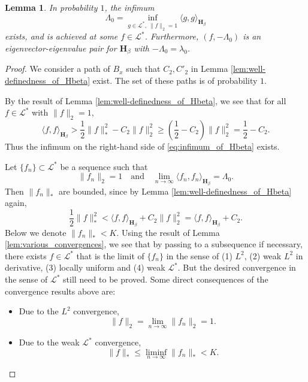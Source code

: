 \documentclass[11pt, a4paper]{article}
\numberwithin{equation}{section}
\newcommand{\Lstar}{\mathcal{L}^*}
\newcommand{\Hbeta}{\mathbf{H}_{\beta}}
\newtheorem{lem}{Lemma}
\theoremstyle{definition}
\theoremstyle{remark}
\begin{document}
\begin{lem} \label{lem:existence_of_lambda_0}
  In probability $1$, the infimum
  \begin{equation} \label{eq:infimum_of_Hbeta}
    \Lambda_0 = \inf_{g \in \Lstar,\ \lVert f \rVert_2 = 1} \langle g, g \rangle_{\Hbeta}
  \end{equation}
  exists, and is achieved at some $f \in \Lstar$. Furthermore, $(f, -\Lambda_0)$ is an eigenvector-eigenvalue pair for $\Hbeta$ with $-\Lambda_0 = \lambda_0$.
\end{lem}
\begin{proof}
  We consider a path of $B_x$ such that $C_2, C'_2$ in Lemma \ref{lem:well-definedness_of_Hbeta} exist. The set of these paths is of probability $1$.

  By the result of Lemma \ref{lem:well-definedness_of_Hbeta}, we see that for all $f \in \Lstar$ with $\lVert f \rVert_2 = 1$,
  \begin{equation}
    \langle f, f \rangle_{\Hbeta} > \frac{1}{2} \lVert f \rVert^2_* - C_2 \lVert f \rVert^2_2 \geq (\frac{1}{2} - C_2) \lVert f \rVert^2_2 = \frac{1}{2} - C_2.
  \end{equation}
  Thus the infimum on the right-hand side of \eqref{eq:infimum_of_Hbeta} exists.

  Let $\{ f_n \} \subset \Lstar$ be a sequence such that
  \begin{equation}
    \lVert f_n \rVert_2 = 1 \quad \text{and} \quad \lim_{n \to \infty} \langle f_n, f_n \rangle_{\Hbeta} = \Lambda_0.
  \end{equation}
  Then $\lVert f_n \rVert_*$ are bounded, since by Lemma \ref{lem:well-definedness_of_Hbeta} again,
  \begin{equation}
    \frac{1}{2} \lVert f \rVert^2_* < \langle f, f \rangle_{\Hbeta} + C_2 \lVert f \rVert^2_2 =  \langle f, f \rangle_{\Hbeta} + C_2.
  \end{equation}
  Below we denote $\lVert f_n \rVert_* < K$. Using the result of Lemma \ref{lem:various_convergences}, we see that by passing to a subsequence if necessary, there exists $f \in \Lstar$ that is the limit of $\{ f_n \}$ in the sense of (1) $L^2$, (2) weak $L^2$ in derivative, (3) locally uniform and (4) weak $\Lstar$. But the desired convergence in the sense of $\Lstar$ still need to be proved. Some direct consequences of the convergence results above are:
  \begin{itemize}
  \item
    Due to the $L^2$ convergence,
    \begin{equation} \label{eq:L^2_conv_of_f}
      \lVert f \rVert_2 = \lim_{n \to \infty} \lVert f_n \rVert_2 = 1.
    \end{equation}
  \item
    Due to the weak $\Lstar$ convergence,
    \begin{equation} \label{eq:L^*_inf_conv_of_f}
      \lVert f \rVert_* \leq \liminf_{n \to \infty} \lVert f_n \rVert_* < K.
    \end{equation}
  \end{itemize}


\end{proof}
\end{document}
